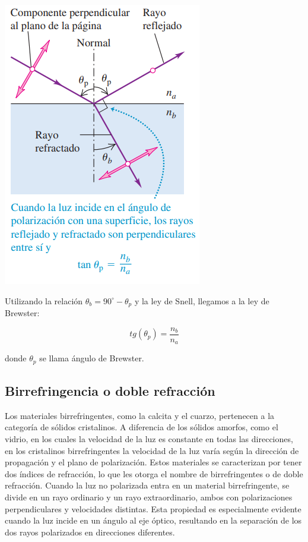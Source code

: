 \documentclass[a4paper,12pt]{article}
\newenvironment{Figure}
  {\par\medskip\noindent\minipage{\linewidth}}
  {\endminipage\par\medskip}
\begin{document}
        \begin{Figure}
            \centering
            \includegraphics[width=0.35\linewidth]{unnamed.png}
            \label{fig: reflexion}
        \end{Figure}

        Utilizando la relación $\theta_b=90^\circ-\theta_p$ y la ley de Snell, llegamos a la ley de Brewster:

        \begin{equation}
            tg(\theta_p)=\frac{n_b}{n_a}
        \end{equation}
        
        donde $\theta_p$ se llama ángulo de Brewster.

    \subsection*{Birrefringencia o doble refracción}

        Los materiales birrefringentes, como la calcita y el cuarzo, pertenecen a la categoría de sólidos cristalinos. A diferencia de los sólidos amorfos, como el vidrio, en los cuales la velocidad de la luz es constante en todas las direcciones, en los cristalinos birrefringentes la velocidad de la luz varía según la dirección de propagación y el plano de polarización. Estos materiales se caracterizan por tener dos índices de refracción, lo que les otorga el nombre de birrefringentes o de doble refracción. Cuando la luz no polarizada entra en un material birrefringente, se divide en un rayo ordinario y un rayo extraordinario, ambos con polarizaciones perpendiculares y velocidades distintas. Esta propiedad es especialmente evidente cuando la luz incide en un ángulo al eje óptico, resultando en la separación de los dos rayos polarizados en direcciones diferentes.
    
\end{document}
